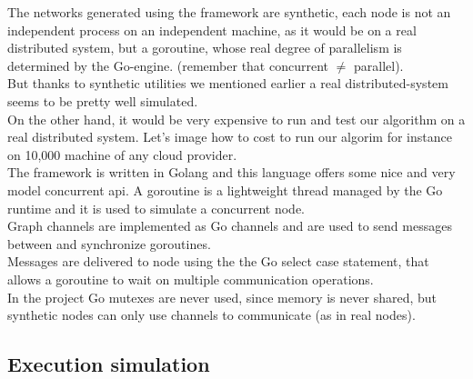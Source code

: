 \documentclass{article}
\begin{document}
The networks generated using the framework are synthetic, each node is not an independent process on an independent machine, as it would be on a real distributed system, but a goroutine, whose real degree of parallelism is determined by the Go-engine. (remember that concurrent  $\ne$ parallel). \\
But thanks to synthetic utilities we mentioned earlier a real distributed-system seems to be pretty well simulated. \\
On the other hand, it would be very expensive to run and test our algorithm on a real distributed system. Let's image how to cost to run our algorim for instance on 10,000 machine of any cloud provider. \\
The framework is written in Golang and this language offers some nice and very model concurrent api.
A goroutine is a lightweight thread managed by the Go runtime and it is used to simulate a concurrent node. \\
Graph channels are implemented as Go channels and are used to send messages between and synchronize goroutines. \\
Messages are delivered to node using the the Go select case statement, that allows a goroutine to wait on multiple communication operations. \\
In the project Go mutexes are never used, since memory is never shared, but synthetic nodes can only use channels to communicate (as in real nodes). \\

\subsection{Execution simulation}
\end{document}
